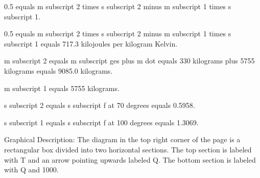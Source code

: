 0.5 equals m subscript 2 times s subscript 2 minus m subscript 1 times s subscript 1.

0.5 equals m subscript 2 times s subscript 2 minus m subscript 1 times s subscript 1 equals 717.3 kilojoules per kilogram Kelvin.

m subscript 2 equals m subscript ges plus m dot equals 330 kilograms plus 5755 kilograms equals 9085.0 kilograms.

m subscript 1 equals 5755 kilograms.

s subscript 2 equals s subscript f at 70 degrees equals 0.5958.

s subscript 1 equals s subscript f at 100 degrees equals 1.3069.

Graphical Description:
The diagram in the top right corner of the page is a rectangular box divided into two horizontal sections. The top section is labeled with T and an arrow pointing upwards labeled Q. The bottom section is labeled with Q and 1000.